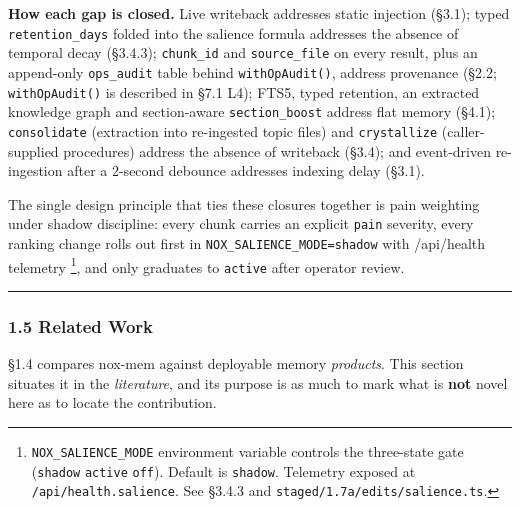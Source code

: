 \documentclass[
]{article}
\begin{document}
\textbf{How each gap is closed.} Live writeback addresses static
injection (§3.1); typed \texttt{retention\_days} folded into the
salience formula addresses the absence of temporal decay (§3.4.3);
\texttt{chunk\_id} and \texttt{source\_file} on every result, plus an
append-only \texttt{ops\_audit} table behind \texttt{withOpAudit()},
address provenance (§2.2; \texttt{withOpAudit()} is described in §7.1
L4); FTS5, typed retention, an extracted knowledge graph and
section-aware \texttt{section\_boost} address flat memory (§4.1);
\texttt{consolidate} (extraction into re-ingested topic files) and
\texttt{crystallize} (caller-supplied procedures) address the absence of
writeback (§3.4); and event-driven re-ingestion after a 2-second
debounce addresses indexing delay (§3.1).

The single design principle that ties these closures together is pain
weighting under shadow discipline: every chunk carries an explicit
\texttt{pain} severity, every ranking change rolls out first in
\texttt{NOX\_SALIENCE\_MODE=shadow} with /api/health telemetry
\footnote{\texttt{NOX\_SALIENCE\_MODE} environment variable controls the
  three-state gate (\texttt{shadow} \textbar{} \texttt{active}
  \textbar{} \texttt{off}). Default is \texttt{shadow}. Telemetry
  exposed at \texttt{/api/health.salience}. See §3.4.3 and
  \texttt{staged/1.7a/edits/salience.ts}.}, and only graduates to
\texttt{active} after operator review.

\begin{center}\rule{0.5\linewidth}{0.5pt}\end{center}

\subsubsection{1.5 Related Work}\label{related-work}

§1.4 compares nox-mem against deployable memory \emph{products}. This
section situates it in the \emph{literature}, and its purpose is as much
to mark what is \textbf{not} novel here as to locate the contribution.
\end{document}
